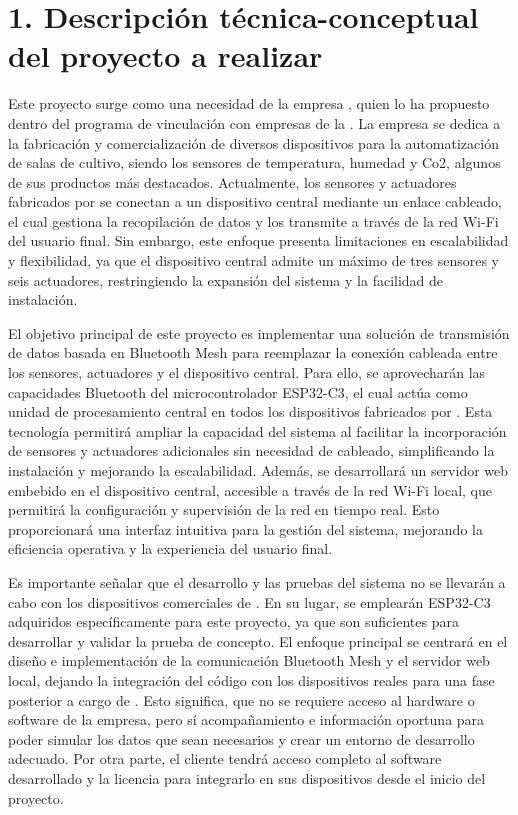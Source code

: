 \documentclass[
11pt, %
]{charter}
\begin{document}
\section{1. Descripción técnica-conceptual del proyecto a realizar}
\label{sec:descripcion}
Este proyecto surge como una necesidad de la empresa {\empclientename}, quien lo ha propuesto dentro del programa de vinculación con empresas de la {\degreename}. La empresa se dedica a la fabricación y comercialización de diversos dispositivos para la automatización de salas de cultivo, siendo los sensores de temperatura, humedad y Co2, algunos de sus productos más destacados. Actualmente, los sensores y actuadores fabricados por {\empclientename} se conectan a un dispositivo central mediante un enlace cableado, el cual gestiona la recopilación de datos y los transmite a través de la red Wi-Fi del usuario final. Sin embargo, este enfoque presenta limitaciones en escalabilidad y flexibilidad, ya que el dispositivo central admite un máximo de tres sensores y seis actuadores, restringiendo la expansión del sistema y la facilidad de instalación.

El objetivo principal de este proyecto es implementar una solución de transmisión de datos basada en Bluetooth Mesh para reemplazar la conexión cableada entre los sensores, actuadores y el dispositivo central. Para ello, se aprovecharán las capacidades Bluetooth del microcontrolador ESP32-C3, el cual actúa como unidad de procesamiento central en todos los dispositivos fabricados por {\empclientename}. Esta tecnología permitirá ampliar la capacidad del sistema al facilitar la incorporación de sensores y actuadores adicionales sin necesidad de cableado, simplificando la instalación y mejorando la escalabilidad. Además, se desarrollará un servidor web embebido en el dispositivo central, accesible a través de la red Wi-Fi local, que permitirá la configuración y supervisión de la red en tiempo real. Esto proporcionará una interfaz intuitiva para la gestión del sistema, mejorando la eficiencia operativa y la experiencia del usuario final.

Es importante señalar que el desarrollo y las pruebas del sistema no se llevarán a cabo con los dispositivos comerciales de {\empclientename}. En su lugar, se emplearán ESP32-C3 adquiridos específicamente para este proyecto, ya que son suficientes para desarrollar y validar la prueba de concepto. El enfoque principal se centrará en el diseño e implementación de la comunicación Bluetooth Mesh y el servidor web local, dejando la integración del código con los dispositivos reales para una fase posterior a cargo de {\empclientename}. Esto significa, que no se requiere acceso al hardware o software de la empresa, pero sí acompañamiento e información oportuna para poder simular los datos que sean necesarios y crear un entorno de desarrollo adecuado. Por otra parte, el cliente tendrá acceso completo al software desarrollado y la licencia para integrarlo en sus dispositivos desde el inicio del proyecto.
\end{document}
